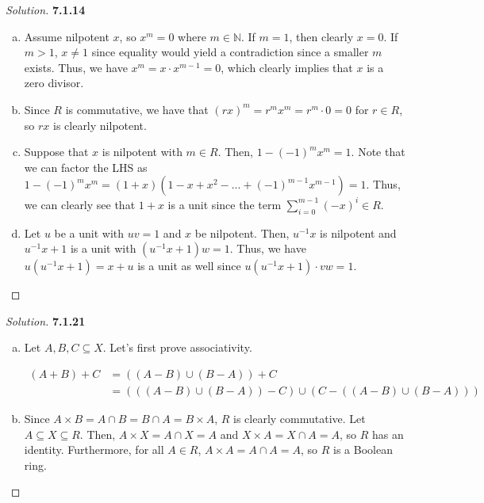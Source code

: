 \documentclass[10pt]{article}
\theoremstyle{definition}
\theoremstyle{remark}
\newenvironment{solution}
  {\renewcommand\qedsymbol{$\blacksquare$}\begin{proof}[Solution]}
  {\end{proof}}
\begin{document}
\begin{solution}
\textbf{7.1.14} \begin{enumerate}[a)]
    \item Assume nilpotent $x$, so $x^m = 0$ where $m \in \mathbb{N}$. If $m = 1$, then clearly $x = 0$. If $m > 1$, $x \neq 1$ since equality would yield a contradiction since a smaller $m$ exists. Thus, we have  $x^m = x \cdot x^{m-1} = 0$, which clearly implies that $x$ is a zero divisor.
    
    \item Since $R$ is commutative, we have that $(rx)^m = r^mx^m = r^m \cdot 0 = 0$ for $r \in R$, so $rx$ is clearly nilpotent.
    
    \item Suppose that $x$ is nilpotent with $m \in R$. Then, $1 -(-1)^mx^m = 1$. Note that we can factor the LHS as $1 -(-1)^mx^m = (1+x)(1-x+x^2-...+(-1)^{m-1}x^{m-1}) = 1$. Thus, we can clearly see that $1+x$ is a unit since the term $\sum_{i=0}^{m-1}(-x)^i \in R$.
    
    \item Let $u$ be a unit with $uv = 1$ and $x$ be nilpotent. Then, $u^{-1}x$ is nilpotent and $u^{-1}x + 1$ is a unit with $(u^{-1}x + 1)w = 1$. Thus, we have $u(u^{-1}x + 1) = x + u$ is a unit as well since $u(u^{-1}x + 1) \cdot vw = 1$.
\end{enumerate}
\end{solution}

\begin{solution}
\textbf{7.1.21}
\begin{enumerate}[a)]
    \item Let $A, B, C \subseteq X$. Let's first prove associativity.
    
    \begin{align*}
        (A+B)+C &= ((A-B) \cup (B-A))+C \\
                &= (((A-B)\cup(B-A))-C) \cup (C-((A-B)\cup(B-A)))
    \end{align*}
    
    \item Since $A \times B = A \cap B = B \cap A = B \times A$, $R$ is clearly commutative. Let $A \subseteq X \subseteq R$. Then, $A \times X = A \cap X = A$ and $X \times A = X \cap A = A$, so $R$ has an identity. Furthermore, for all $A \in R$, $A \times A = A \cap A = A$, so $R$ is a Boolean ring. 
\end{enumerate}
\end{solution}
\end{document}
